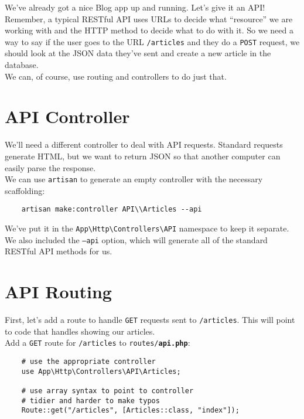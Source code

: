 We've already got a nice Blog app up and running. Let's give it an API!
\\

Remember, a typical RESTful API uses URLs to decide what ``resource'' we are working with and the HTTP method to decide what to do with it. So we need a way to say if the user goes to the URL \texttt{/articles} and they do a \texttt{POST} request, we should look at the JSON data they've sent and create a new article in the database.
\\

We can, of course, use routing and controllers to do just that.

\section{API Controller}

We'll need a different controller to deal with API requests. Standard requests generate HTML, but we want to return JSON so that another computer can easily parse the response.
\\

We can use \texttt{artisan} to generate an empty controller with the necessary scaffolding:

\begin{verbatim}
    artisan make:controller API\\Articles --api
\end{verbatim}

We've put it in the \texttt{App\textbackslash{}Http\textbackslash{}Controllers\textbackslash{}API} namespace to keep it separate. We also included the \texttt{--api} option, which will generate all of the standard RESTful API methods for us.


\section{API Routing}

First, let's add a route to handle \texttt{GET} requests sent to \texttt{/articles}. This will point to code that handles showing our articles.
\\

Add a \texttt{GET} route for \texttt{/articles} to \texttt{routes/\textbf{api.php}}:

\begin{verbatim}
    # use the appropriate controller
    use App\Http\Controllers\API\Articles;

    # use array syntax to point to controller
    # tidier and harder to make typos
    Route::get("/articles", [Articles::class, "index"]);
\end{verbatim}

